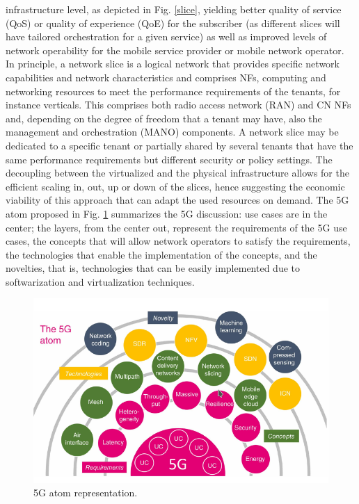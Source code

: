 \documentclass{article}
\begin{document}
infrastructure level, as depicted in Fig. \ref{slice}, yielding better quality of service (QoS) or quality of
experience (QoE) for the subscriber (as different slices will have tailored orchestration for a given
service) as well as improved levels of network operability for the mobile service provider or mobile
network operator.
In principle, a network slice is a logical network that provides specific network capabilities and
network characteristics and comprises NFs, computing and networking resources to meet the
­performance requirements of the tenants, for instance verticals. This comprises both radio access
network (RAN) and CN NFs and, depending on the degree of freedom that a tenant may have, also
the management and orchestration (MANO) components. A network slice may be dedicated to a
specific tenant or partially shared by several tenants that have the same performance requirements
but ­different security or policy settings. The decoupling between the virtualized and the physical
­infrastructure allows for the efficient scaling in, out, up or down of the slices, hence suggesting the
economic viability of this approach that can adapt the used resources on demand.
The 5G atom proposed in Fig. \ref{atom} summarizes the 5G discussion: use cases are in the center; the layers, from the center out, represent the requirements of the 5G use cases, the concepts that will allow network
operators to satisfy the requirements, the technologies that enable the implementation of
the concepts, and the novelties, that is, technologies that can be easily implemented due
to softwarization and virtualization techniques.
\begin{figure}[h]
\centering
\includegraphics[scale=0.63]{pics/5g_atom.png} 
\caption{5G atom representation.}
\label{atom}
\end{figure}
\end{document}
